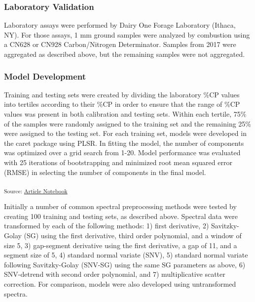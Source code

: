 \documentclass[
]{agujournal2019}
\begin{document}
\subsubsection{Laboratory Validation}\label{laboratory-validation}

Laboratory assays were performed by Dairy One Forage Laboratory (Ithaca,
NY). For those assays, 1 mm ground samples were analyzed by combustion
using a CN628 or CN928 Carbon/Nitrogen Determinator. Samples from 2017
were aggregated as described above, but the remaining samples were not
aggregated.

\subsubsection{Model Development}\label{model-development}

Training and testing sets were created by dividing the laboratory \%CP
values into tertiles according to their \%CP in order to ensure that the
range of \%CP values was present in both calibration and testing sets.
Within each tertile, 75\% of the samples were randomly assigned to the
training set and the remaining 25\% were assigned to the testing set.
For each training set, models were developed in the caret package using
PLSR. In fitting the model, the number of components was optimized over
a grid search from 1-20. Model performance was evaluated with 25
iterations of bootstrapping and minimized root mean squared error (RMSE)
in selecting the number of components in the final model.

\textsubscript{Source:
\href{https://rvcrawford.github.io/glowing-system/index.qmd.html}{Article
Notebook}}

Initially a number of common spectral preprocessing methods were tested
by creating 100 training and testing sets, as described above. Spectral
data were transformed by each of the following methods: 1) first
derivative, 2) Savitzky-Golay (SG) using the first derivative, third
order polynomial, and a window of size 5, 3) gap-segment derivative
using the first derivative, a gap of 11, and a segment size of 5, 4)
standard normal variate (SNV), 5) standard normal variate following
Savitzky-Golay (SNV-SG) using the same SG parameters as above, 6)
SNV-detrend with second order polynomial, and 7) multiplicative scatter
correction. For comparison, models were also developed using
untransformed spectra.
\end{document}
